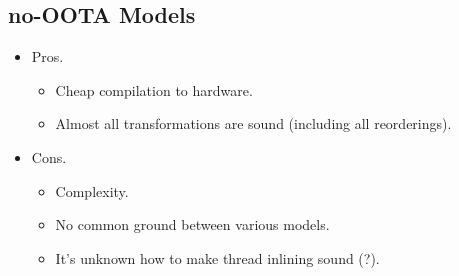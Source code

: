 \subsection{no-OOTA Models}

\begin{itemize}
  \item Pros.
  \begin{itemize}
    \item Cheap compilation to hardware.
    \item Almost all transformations are sound (including all reorderings). 
  \end{itemize}
  \item Cons.
  \begin{itemize}
    \item Complexity.
    \item No common ground between various models.
    \item It's unknown how to make thread inlining sound (?).
  \end{itemize}
\end{itemize}

